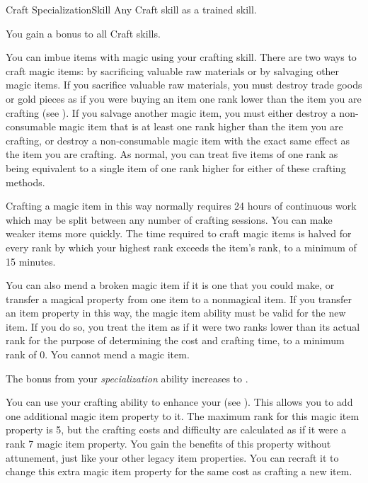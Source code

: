     \begin{feat}{Craft Specialization}{Skill}
        \featpre Any Craft skill as a trained skill.

         You gain a  bonus to all Craft skills.

         You can imbue items with magic using your crafting skill.
        There are two ways to craft magic items: by sacrificing valuable raw materials or by salvaging other magic items.
        If you sacrifice valuable raw materials, you must destroy trade goods or gold pieces as if you were buying an item one rank lower than the item you are crafting  (see ).
        If you salvage another magic item, you must either destroy a non-consumable magic item that is at least one rank higher than the item you are crafting, or destroy a non-consumable magic item with the exact same effect as the item you are crafting.
        As normal, you can treat five items of one rank as being equivalent to a single item of one rank higher for either of these crafting methods.

        Crafting a magic item in this way normally requires 24 hours of continuous work which may be split between any number of crafting sessions.
        You can make weaker items more quickly.
        The time required to craft magic items is halved for every rank by which your highest rank exceeds the item's rank, to a minimum of 15 minutes.

        You can also mend a broken magic item if it is one that you could make, or transfer a magical property from one item to a nonmagical item.
        If you transfer an item property in this way, the magic item ability must be valid for the new item.
        If you do so, you treat the item as if it were two ranks lower than its actual rank for the purpose of determining the cost and crafting time, to a minimum rank of 0.
        You cannot mend a  magic item.

         The bonus from your \textit{specialization} ability increases to .

         You can use your crafting ability to enhance your  (see ).
        This allows you to add one additional magic item property to it.
        The maximum rank for this magic item property is 5, but the crafting costs and difficulty are calculated as if it were a rank 7 magic item property.
        You gain the benefits of this property without attunement, just like your other legacy item properties.
        You can recraft it to change this extra magic item property for the same cost as crafting a new item.
    \end{feat}

